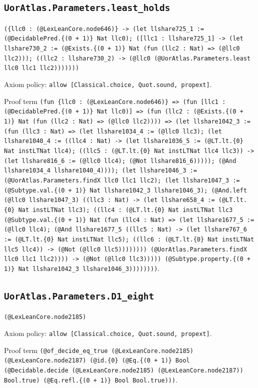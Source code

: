 \documentclass[11pt]{article}
\begin{document}
\subsection*{\texttt{UorAtlas.Parameters.least\_holds}}
\noindent\texttt{(\{llc0 : (@LexLeanCore.node646)\} -> (let llshare725\_1 := (@DecidablePred.\{(0 + 1)\} Nat llc0); ([llc1 : llshare725\_1] -> (let llshare730\_2 := (@Exists.\{(0 + 1)\} Nat (fun (llc2 : Nat) => (@llc0 llc2))); ((llc2 : llshare730\_2) -> (@llc0 (@UorAtlas.Parameters.least llc0 llc1 llc2)))))))}\par
\noindent Axiom policy: \texttt{allow [Classical.choice, Quot.sound, propext]}.\par
\noindent Proof term \texttt{(fun \{llc0 : (@LexLeanCore.node646)\} => (fun [llc1 : (@DecidablePred.\{(0 + 1)\} Nat llc0)] => (fun (llc2 : (@Exists.\{(0 + 1)\} Nat (fun (llc2 : Nat) => (@llc0 llc2)))) => (let llshare1042\_3 := (fun (llc3 : Nat) => (let llshare1034\_4 := (@llc0 llc3); (let llshare1040\_4 := ((llc4 : Nat) -> (let llshare1036\_5 := (@LT.lt.\{0\} Nat instLTNat llc4); ((llc5 : (@LT.lt.\{0\} Nat instLTNat llc4 llc3)) -> (let llshare816\_6 := (@llc0 llc4); (@Not llshare816\_6))))); (@And llshare1034\_4 llshare1040\_4)))); (let llshare1046\_3 := (@UorAtlas.Parameters.findX llc0 llc1 llc2); (let llshare1047\_3 := (@Subtype.val.\{(0 + 1)\} Nat llshare1042\_3 llshare1046\_3); (@And.left (@llc0 llshare1047\_3) ((llc3 : Nat) -> (let llshare658\_4 := (@LT.lt.\{0\} Nat instLTNat llc3); ((llc4 : (@LT.lt.\{0\} Nat instLTNat llc3 (@Subtype.val.\{(0 + 1)\} Nat (fun (llc4 : Nat) => (let llshare1677\_5 := (@llc0 llc4); (@And llshare1677\_5 ((llc5 : Nat) -> (let llshare767\_6 := (@LT.lt.\{0\} Nat instLTNat llc5); ((llc6 : (@LT.lt.\{0\} Nat instLTNat llc5 llc4)) -> (@Not (@llc0 llc5)))))))) (@UorAtlas.Parameters.findX llc0 llc1 llc2)))) -> (@Not (@llc0 llc3))))) (@Subtype.property.\{(0 + 1)\} Nat llshare1042\_3 llshare1046\_3))))))))}.\par
\subsection*{\texttt{UorAtlas.Parameters.D1\_eight}}
\noindent\texttt{(@LexLeanCore.node2185)}\par
\noindent Axiom policy: \texttt{allow [Classical.choice, Quot.sound, propext]}.\par
\noindent Proof term \texttt{(@of\_decide\_eq\_true (@LexLeanCore.node2185) (@LexLeanCore.node2187) (@id.\{0\} (@Eq.\{(0 + 1)\} Bool (@Decidable.decide (@LexLeanCore.node2185) (@LexLeanCore.node2187)) Bool.true) (@Eq.refl.\{(0 + 1)\} Bool Bool.true)))}.\par
\end{document}
